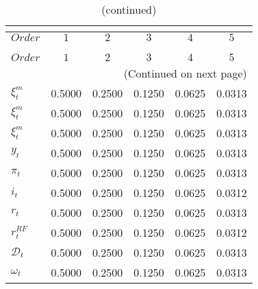  
\begin{center}
\begin{longtable}{lccccc} 
\caption{COEFFICIENTS OF AUTOCORRELATION}\\
 \label{Table:th_autocorr_matrix}\\
\toprule 
$Order          $	 & 	 $         1$	 & 	 $         2$	 & 	 $         3$	 & 	 $         4$	 & 	 $         5$\\
\midrule \endfirsthead 
\caption{(continued)}\\
 \toprule \\ 
$Order          $	 & 	 $         1$	 & 	 $         2$	 & 	 $         3$	 & 	 $         4$	 & 	 $         5$\\
\midrule \endhead 
\midrule \multicolumn{6}{r}{(Continued on next page)} \\ \bottomrule \endfoot 
\bottomrule \endlastfoot 
$\xi^m_t        $	 & 	    0.5000	 & 	    0.2500	 & 	    0.1250	 & 	    0.0625	 & 	    0.0313 \\ 
$\xi^m_t        $	 & 	    0.5000	 & 	    0.2500	 & 	    0.1250	 & 	    0.0625	 & 	    0.0313 \\ 
$\xi^m_t        $	 & 	    0.5000	 & 	    0.2500	 & 	    0.1250	 & 	    0.0625	 & 	    0.0313 \\ 
$y_t            $	 & 	    0.5000	 & 	    0.2500	 & 	    0.1250	 & 	    0.0625	 & 	    0.0313 \\ 
$\pi_t          $	 & 	    0.5000	 & 	    0.2500	 & 	    0.1250	 & 	    0.0625	 & 	    0.0313 \\ 
$i_t            $	 & 	    0.5000	 & 	    0.2500	 & 	    0.1250	 & 	    0.0625	 & 	    0.0312 \\ 
$r_t            $	 & 	    0.5000	 & 	    0.2500	 & 	    0.1250	 & 	    0.0625	 & 	    0.0313 \\ 
$r^{RF}_t       $	 & 	    0.5000	 & 	    0.2500	 & 	    0.1250	 & 	    0.0625	 & 	    0.0312 \\ 
$\mathcal{D}_t  $	 & 	    0.5000	 & 	    0.2500	 & 	    0.1250	 & 	    0.0625	 & 	    0.0313 \\ 
$\omega_t       $	 & 	    0.5000	 & 	    0.2500	 & 	    0.1250	 & 	    0.0625	 & 	    0.0313 \\ 
\end{longtable}
 \end{center}
